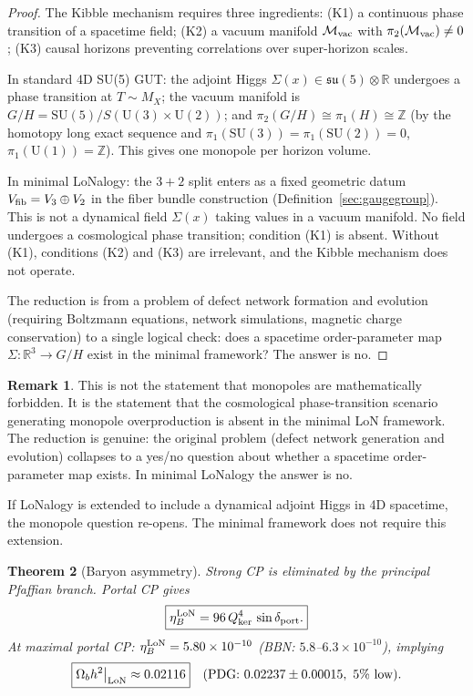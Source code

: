 \documentclass[12pt]{article}
\theoremstyle{plain}
\newtheorem{theorem}{Theorem}[section]
\theoremstyle{definition}
\newtheorem{remark}[theorem]{Remark}
\numberwithin{equation}{section}
\newcommand{\kker}{\mathrm{ker}}
\begin{document}
\begin{proof}
The Kibble mechanism requires three ingredients: (K1) a continuous phase transition of a spacetime field; (K2) a vacuum manifold $\mathcal{M}_{\rm vac}$ with $\pi_2(\mathcal{M}_{\rm vac})\neq0$; (K3) causal horizons preventing correlations over super-horizon scales.

In standard 4D SU(5) GUT: the adjoint Higgs $\Sigma(x)\in\mathfrak{su}(5)\otimes\mathbb{R}$ undergoes a phase transition at $T\sim M_X$; the vacuum manifold is $G/H=\mathrm{SU}(5)/S(\mathrm{U}(3)\times\mathrm{U}(2))$; and $\pi_2(G/H)\cong\pi_1(H)\cong\mathbb{Z}$ (by the homotopy long exact sequence and $\pi_1(\mathrm{SU}(3))=\pi_1(\mathrm{SU}(2))=0$, $\pi_1(\mathrm{U}(1))=\mathbb{Z}$).  This gives one monopole per horizon volume.

In minimal LoNalogy: the $3+2$ split enters as a fixed geometric datum $V_{\rm fib}=V_3\oplus V_2$ in the fiber bundle construction (Definition~\ref{sec:gaugegroup}).  This is not a dynamical field $\Sigma(x)$ taking values in a vacuum manifold.  No field undergoes a cosmological phase transition; condition (K1) is absent.  Without (K1), conditions (K2) and (K3) are irrelevant, and the Kibble mechanism does not operate.

The reduction is from a problem of defect network formation and evolution (requiring Boltzmann equations, network simulations, magnetic charge conservation) to a single logical check: does a spacetime order-parameter map $\Sigma:\mathbb{R}^3\to G/H$ exist in the minimal framework?  The answer is no.
\end{proof}

\begin{remark}
This is not the statement that monopoles are mathematically forbidden.  It is the statement that the cosmological phase-transition scenario generating monopole overproduction is absent in the minimal LoN framework.  The reduction is genuine: the original problem (defect network generation and evolution) collapses to a yes/no question about whether a spacetime order-parameter map exists.  In minimal LoNalogy the answer is no.

If LoNalogy is extended to include a dynamical adjoint Higgs in 4D spacetime, the monopole question re-opens.  The minimal framework does not require this extension.
\end{remark}



\begin{theorem}[Baryon asymmetry]\label{thm:baryogen}
Strong CP is eliminated by the principal Pfaffian branch.  Portal CP gives
\[
\boxed{\eta_B^{\rm LoN} = 96\,Q_{\kker}^4\,\sin\delta_{\rm port}.}
\]
At maximal portal CP: $\eta_B^{\rm LoN}=5.80\times10^{-10}$ (BBN: $5.8$--$6.3\times10^{-10}$), implying
\[
\boxed{\Omega_b h^2\big|_{\rm LoN}\approx0.02116}\quad(\text{PDG: }0.02237\pm0.00015,\ 5\%\text{ low}).
\]
\end{theorem}
\end{document}
